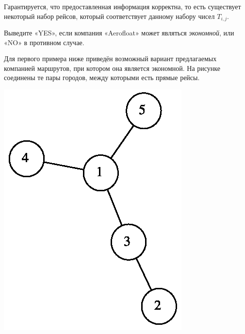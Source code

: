 \begin{problem}
Гарантируется, что предоставленная информация корректна, то есть существует некоторый набор рейсов, который соответствует данному набору чисел $T_{i,j}$.

\OutputFile

Выведите «YES», если компания «Aerofloat» может являться \textit{экономной}, или «NO» в противном случае.

\Examples

\begin{example}
%
%
\end{example}

\Explanation

Для первого примера ниже приведён возможный вариант предлагаемых компанией маршрутов, при котором она является экономной. На рисунке соединены те пары городов, между которыми есть прямые рейсы.

\includegraphics[scale=0.5]{images/1.png}

\end{problem}